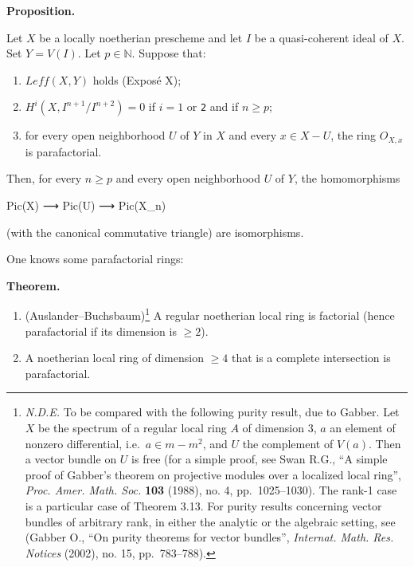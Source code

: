 \documentclass[
]{article}
\newenvironment{Shaded}{}{}
\newcommand{\NormalTok}[1]{#1}
\providecommand{\tightlist}{%
  \setlength{\itemsep}{0pt}\setlength{\parskip}{0pt}}
\begin{document}
\textbf{Proposition.}

Let \(X\) be a locally noetherian prescheme and let \(I\) be a
quasi-coherent ideal of \(X\). Set \(Y = V(I)\). Let
\(p \in \mathbb{N}\). Suppose that:

\begin{enumerate}
\def\labelenumi{\arabic{enumi}.}
\tightlist
\item
  \(Leff(X, Y)\) holds (Exposé X);
\item
  \(H^{i}(X, I^{n+1}/I^{n+2}) = 0\) if \(i = 1\) or \texttt{2} and if
  \(n \geqslant p\);
\item
  for every open neighborhood \(U\) of \(Y\) in \(X\) and every
  \(x \in X - U\), the ring \(O_{X,x}\) is parafactorial.
\end{enumerate}

Then, for every \(n \geqslant p\) and every open neighborhood \(U\) of
\(Y\), the homomorphisms

\begin{Shaded}
\begin{Highlighting}[]
\NormalTok{Pic(X) ⟶ Pic(U) ⟶ Pic(X\_n)}
\end{Highlighting}
\end{Shaded}

(with the canonical commutative triangle) are isomorphisms.

One knows some parafactorial rings:

\textbf{Theorem.}

\begin{enumerate}
\def\labelenumi{\arabic{enumi}.}
\tightlist
\item
  (Auslander--Buchsbaum)\footnote{\emph{N.D.E.} To be compared with the
    following purity result, due to Gabber. Let \(X\) be the spectrum of
    a regular local ring \(A\) of dimension 3, \(a\) an element of
    nonzero differential, i.e.~\(a \in m - m^{2}\), and \(U\) the
    complement of \(V(a)\). Then a vector bundle on \(U\) is free (for a
    simple proof, see Swan R.G., ``A simple proof of Gabber's theorem on
    projective modules over a localized local ring'', \emph{Proc. Amer.
    Math. Soc.} \textbf{103} (1988), no. 4, pp.~1025--1030). The rank-1
    case is a particular case of Theorem 3.13. For purity results
    concerning vector bundles of arbitrary rank, in either the analytic
    or the algebraic setting, see (Gabber O., ``On purity theorems for
    vector bundles'', \emph{Internat. Math. Res. Notices} (2002), no.
    15, pp.~783--788).} A regular noetherian local ring is factorial
  (hence parafactorial if its dimension is \(\geqslant 2\)).
\item
  A noetherian local ring of dimension \(\geqslant 4\) that is a
  complete intersection is parafactorial.
\end{enumerate}
\end{document}
